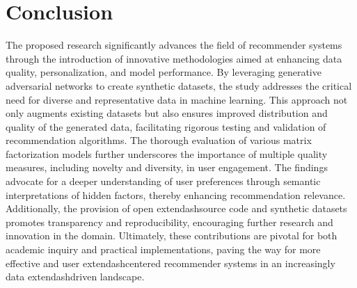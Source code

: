 \documentclass[runningheads]{llncs}
\begin{document}
\section{Conclusion}
The proposed research significantly advances the field of recommender systems through the introduction of innovative methodologies aimed at enhancing data quality, personalization, and model performance. By leveraging generative adversarial networks to create synthetic datasets, the study addresses the critical need for diverse and representative data in machine learning. This approach not only augments existing datasets but also ensures improved distribution and quality of the generated data, facilitating rigorous testing and validation of recommendation algorithms. The thorough evaluation of various matrix factorization models further underscores the importance of multiple quality measures, including novelty and diversity, in user engagement. The findings advocate for a deeper understanding of user preferences through semantic interpretations of hidden factors, thereby enhancing recommendation relevance. Additionally, the provision of open	extendash{}source code and synthetic datasets promotes transparency and reproducibility, encouraging further research and innovation in the domain. Ultimately, these contributions are pivotal for both academic inquiry and practical implementations, paving the way for more effective and user	extendash{}centered recommender systems in an increasingly data	extendash{}driven landscape.
\end{document}
